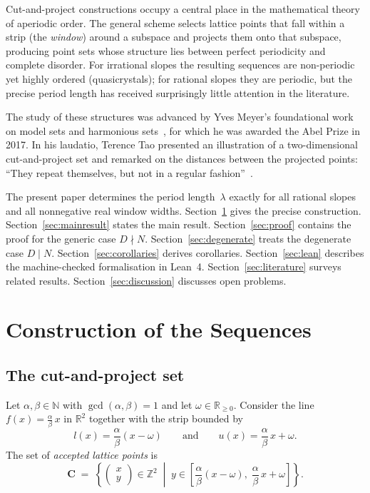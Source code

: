 \documentclass[11pt]{article}
\theoremstyle{plain}
\theoremstyle{definition}
\theoremstyle{remark}
\begin{document}
Cut-and-project constructions occupy a central place in the mathematical
theory of aperiodic order.  The general scheme selects lattice points that
fall within a strip (the \emph{window}) around a subspace and projects them
onto that subspace, producing point sets whose structure lies between perfect
periodicity and complete disorder.  For irrational slopes the resulting
sequences are non-periodic yet highly ordered (quasicrystals); for rational
slopes they are periodic, but the precise period length has received
surprisingly little attention in the literature.

The study of these structures was advanced by Yves Meyer's foundational work
on model sets and harmonious sets~\cite{Meyer1972}, for which he was awarded
the Abel Prize in 2017.  In his laudatio, Terence Tao presented an
illustration of a two-dimensional cut-and-project set and remarked on the
distances between the projected points: ``They repeat themselves, but not in
a regular fashion''~\cite{SpeechTao}.

The present paper determines the period length~$\lambda$ exactly for all
rational slopes and all nonnegative real window widths.
Section~\ref{sec:setup} gives the precise construction.
Section~\ref{sec:mainresult} states the main result.
Section~\ref{sec:proof} contains the proof for the generic case $D \nmid N$.
Section~\ref{sec:degenerate} treats the degenerate case $D \mid N$.
Section~\ref{sec:corollaries} derives corollaries.
Section~\ref{sec:lean} describes the machine-checked formalisation in Lean~4.
Section~\ref{sec:literature} surveys related results.
Section~\ref{sec:discussion} discusses open problems.

\section{Construction of the Sequences}\label{sec:setup}

\subsection{The cut-and-project set}\label{subsec:construction}

Let $\alpha, \beta \in \mathbb{N}$ with $\gcd(\alpha, \beta) = 1$ and let
$\omega \in \mathbb{R}_{\ge 0}$.
Consider the line $f(x) = \frac{\alpha}{\beta}\,x$ in $\mathbb{R}^2$ together
with the strip bounded by
\[
    l(x) = \frac{\alpha}{\beta}(x - \omega)
    \qquad\text{and}\qquad
    u(x) = \frac{\alpha}{\beta}\,x + \omega.
\]
The set of \emph{accepted lattice points} is
\begin{equation}\label{eq:points}
    \mathbf{C} \;=\; \left\{
    \begin{pmatrix} x \\ y \end{pmatrix} \in \mathbb{Z}^2
    \;\middle|\;
    y \in
    \left[\frac{\alpha}{\beta}(x - \omega),\;
          \frac{\alpha}{\beta}\,x + \omega\right]
    \right\}.
\end{equation}
\end{document}
